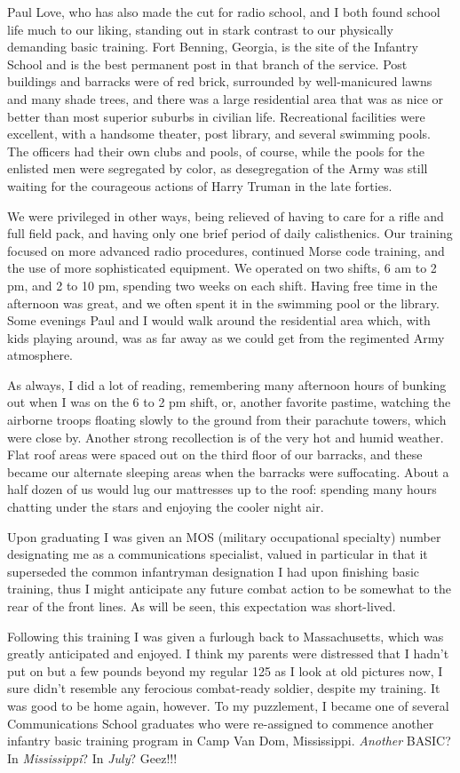 
Paul Love, who has also made the cut for radio school, and I both found school life much to our liking, standing out in stark contrast to our physically demanding basic training. Fort Benning, Georgia, is the site of the Infantry School and is the best permanent post in that branch of the service. Post buildings and barracks were of red brick, surrounded by well-manicured lawns and many shade trees, and there was a large residential area that was as nice or better than most superior suburbs in civilian life. Recreational facilities were excellent, with a handsome theater, post library, and several swimming pools. The officers had their own clubs and pools, of course, while the pools for the enlisted men were segregated by color, as desegregation of the Army was still waiting for the courageous actions of Harry Truman in the late forties.

We were privileged in other ways, being relieved of having to care for a rifle and full field pack, and having only one brief period of daily calisthenics. Our training focused on more advanced radio procedures, continued Morse code training, and the use of more sophisticated equipment. We operated on two shifts, 6 am to 2 pm, and 2 to 10 pm, spending two weeks on each shift. Having free time in the afternoon was great, and we often spent it in the swimming pool or the library. Some evenings Paul and I would walk around the residential area which, with kids playing around, was as far away as we could get from the regimented Army atmosphere.

As always, I did a lot of reading, remembering many afternoon hours of bunking out when I was on the 6 to 2 pm shift, or, another favorite pastime, watching the airborne troops floating slowly to the ground from their parachute towers, which were close by. Another strong recollection is of the very hot and humid weather. Flat roof areas were spaced out on the third floor of our barracks, and these became our alternate sleeping areas when the barracks were suffocating. About a half dozen of us would lug our mattresses up to the roof: spending many hours chatting under the stars and enjoying the cooler night air.

Upon graduating I was given an MOS (military occupational specialty) number designating me as a communications specialist, valued in particular in that it superseded the common infantryman designation I had upon finishing basic training, thus I might anticipate any future combat action to be somewhat to the rear of the front lines. As will be seen, this expectation was short-lived.

Following this training I was given a furlough back to Massachusetts, which was greatly anticipated and enjoyed. I think my parents were distressed that I hadn't put on but a few pounds beyond my regular 125 as I look at old pictures now, I sure didn't resemble any ferocious combat-ready soldier, despite my training. It was good to be home again, however. To my puzzlement, I became one of several Communications School graduates who were re-assigned to commence another infantry basic training program in Camp Van Dom, Mississippi. \emph{Another} BASIC? In \emph{Mississippi}? In \emph{July}? Geez!!!
